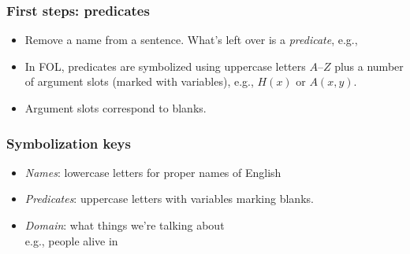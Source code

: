 \begin{frame}
  \frametitle{First steps: predicates}

  \begin{itemize}[<+->]
    \item Remove a name from a sentence. What's left over is a \emph{predicate}, e.g.,\\
    \item In FOL, predicates are symbolized using uppercase letters
    $A$--$Z$ plus a number of argument slots (marked with variables),
    e.g., $H(x)$ or $A(x,y)$.
    \item Argument slots correspond to blanks.
  \end{itemize}
\end{frame}

\begin{frame}
  \frametitle{Symbolization keys}

  \begin{itemize}[<+->]
    \item \emph{Names}: lowercase letters for proper names of English
    \item \emph{Predicates}: uppercase letters with variables marking
    blanks.
    \item \emph{Domain}: what things we're talking about\\
    e.g., people alive in \lecyear{}
  \end{itemize}
\end{frame}

